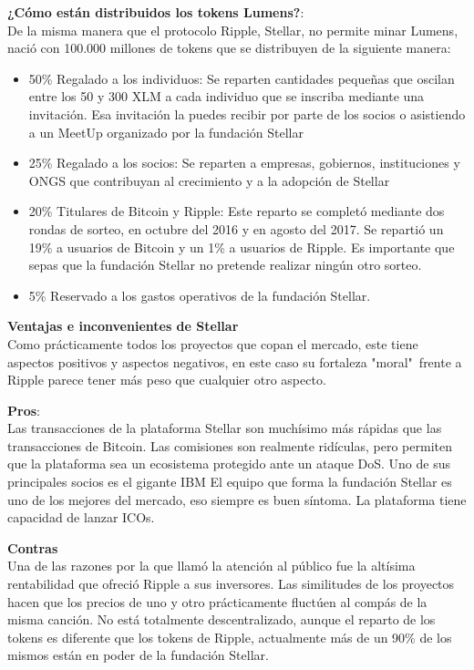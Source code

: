 \documentclass[a4paper,12pt]{/home/armando/Documentos/Cursos/LaTeX/Plantillas/lib/pub}
\begin{document}
	\textbf{¿Cómo están distribuidos los tokens Lumens?}:\\
	De la misma manera que el protocolo Ripple, Stellar, no permite minar Lumens, nació con 100.000 millones de tokens que se distribuyen de la siguiente manera:
	\begin{itemize}
		\item 50\% Regalado a los individuos: Se reparten cantidades pequeñas que oscilan entre los 50 y 300 XLM a cada individuo que se inscriba mediante una invitación. Esa invitación la puedes recibir por parte de los socios o asistiendo a un MeetUp organizado por la fundación Stellar
		\item 25\% Regalado a los socios: Se reparten a empresas, gobiernos, instituciones y ONGS que contribuyan al crecimiento y a la adopción de Stellar
		\item 20\% Titulares de Bitcoin y Ripple: Este reparto se completó mediante dos rondas de sorteo, en octubre del 2016 y en agosto del 2017. Se repartió un 19\% a usuarios de Bitcoin y un 1\% a usuarios de Ripple. Es importante que sepas que la fundación Stellar no pretende realizar ningún otro sorteo.
		\item 5\% Reservado a los gastos operativos de la fundación Stellar.
	\end{itemize}
	\textbf{Ventajas e inconvenientes de Stellar}\\
	Como prácticamente todos los proyectos que copan el mercado, este tiene aspectos positivos y aspectos negativos, en este caso su fortaleza "moral"\ frente a Ripple parece tener más peso que cualquier otro aspecto.
	
	\textbf{Pros}:\\
	Las transacciones de la plataforma Stellar son muchísimo más rápidas que las transacciones de Bitcoin.
	Las comisiones son realmente ridículas, pero permiten que la plataforma sea un ecosistema protegido ante un ataque DoS.
	Uno de sus principales socios es el gigante IBM
	El equipo que forma la fundación Stellar es uno de los mejores del mercado, eso siempre es buen síntoma.
	La plataforma tiene capacidad de lanzar ICOs.
	
	\textbf{Contras}\\
	Una de las razones por la que llamó la atención al público fue la altísima rentabilidad que ofreció Ripple a sus inversores. Las similitudes de los proyectos hacen que los precios de uno y otro prácticamente fluctúen al compás de la misma canción.
	No está totalmente descentralizado, aunque el reparto de los tokens es diferente que los tokens de Ripple, actualmente más de un 90\% de los mismos están en poder de la fundación Stellar.
	
\end{document}
